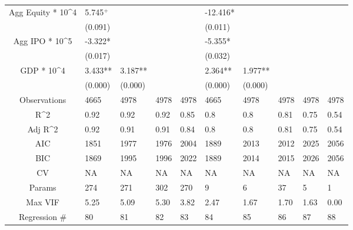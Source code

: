 \documentclass{article}
\begin{document}
\begin{table}[H]
\begin{tabular}{|clllllllll|}
  Agg Equity * 10^4 & 5.745$^{+}$ &  &  &  & -12.416* &  &  &  &  \\
   & (0.091) &  &  &  & (0.011) &  &  &  &  \\
  Agg IPO * 10^5 & -3.322* &  &  &  & -5.355* &  &  &  &  \\
   & (0.017) &  &  &  & (0.032) &  &  &  &  \\
  GDP * 10^4 & 3.433** & 3.187** &  &  & 2.364** & 1.977** &  &  &  \\
   & (0.000) & (0.000) &  &  & (0.000) & (0.000) &  &  &  \\
  \hline
 Observations & 4665 & 4978 & 4978 & 4978 & 4665 & 4978 & 4978 & 4978 & 4978 \\
  R^2 & 0.92 & 0.92 & 0.92 & 0.85 & 0.8 & 0.8 & 0.81 & 0.75 & 0.54 \\
  Adj R^2 & 0.92 & 0.91 & 0.91 & 0.84 & 0.8 & 0.8 & 0.81 & 0.75 & 0.54 \\
  AIC & 1851 & 1977 & 1976 & 2004 & 1889 & 2013 & 2012 & 2025 & 2056 \\
  BIC & 1869 & 1995 & 1996 & 2022 & 1889 & 2014 & 2015 & 2026 & 2056 \\
  CV & NA & NA & NA & NA & NA & NA & NA & NA & NA \\
  Params & 274 & 271 & 302 & 270 & 9 & 6 & 37 & 5 & 1 \\
  Max VIF & 5.25 & 5.09 & 5.30 & 3.82 & 2.47 & 1.67 & 1.70 & 1.63 & 0.00 \\
  Regression \# & 80 & 81 & 82 & 83 & 84 & 85 & 86 & 87 & 88 \\
   \hline
\end{tabular}

\end{table}
\end{document}
